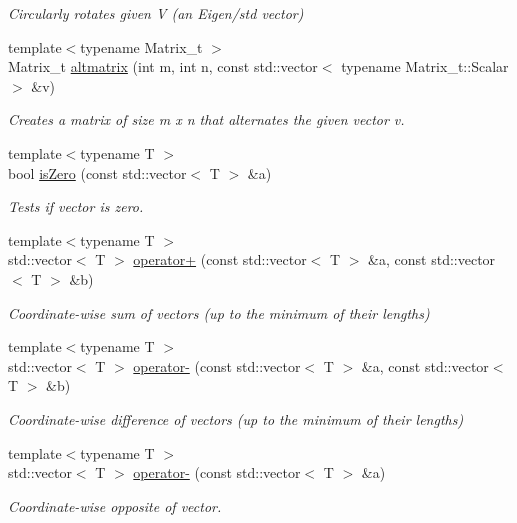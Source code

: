 \begin{DoxyCompactItemize}
\begin{DoxyCompactList}\small\item\em Circularly rotates given V (an Eigen/std vector) \end{DoxyCompactList}\item 
{\footnotesize template$<$typename Matrix\+\_\+t $>$ }\\Matrix\+\_\+t \hyperlink{namespaceMackey_a26a529f63caac9c5b4dc809e0e5831be}{altmatrix} (int m, int n, const std\+::vector$<$ typename Matrix\+\_\+t\+::\+Scalar $>$ \&v)
\begin{DoxyCompactList}\small\item\em Creates a matrix of size m x n that alternates the given vector v. \end{DoxyCompactList}\item 
{\footnotesize template$<$typename T $>$ }\\bool \hyperlink{namespaceMackey_a4c3647777bc890a4649ae24b138bbb79}{is\+Zero} (const std\+::vector$<$ T $>$ \&a)
\begin{DoxyCompactList}\small\item\em Tests if vector is zero. \end{DoxyCompactList}\item 
{\footnotesize template$<$typename T $>$ }\\std\+::vector$<$ T $>$ \hyperlink{namespaceMackey_adb4974b5ffe533abb955ccb6b9096155}{operator+} (const std\+::vector$<$ T $>$ \&a, const std\+::vector$<$ T $>$ \&b)
\begin{DoxyCompactList}\small\item\em Coordinate-\/wise sum of vectors (up to the minimum of their lengths) \end{DoxyCompactList}\item 
{\footnotesize template$<$typename T $>$ }\\std\+::vector$<$ T $>$ \hyperlink{namespaceMackey_ae86e49097ef9a09ebcd0173881e88786}{operator-\/} (const std\+::vector$<$ T $>$ \&a, const std\+::vector$<$ T $>$ \&b)
\begin{DoxyCompactList}\small\item\em Coordinate-\/wise difference of vectors (up to the minimum of their lengths) \end{DoxyCompactList}\item 
{\footnotesize template$<$typename T $>$ }\\std\+::vector$<$ T $>$ \hyperlink{namespaceMackey_a9d67cfe3e93ac3ef2301547372b48e15}{operator-\/} (const std\+::vector$<$ T $>$ \&a)
\begin{DoxyCompactList}\small\item\em Coordinate-\/wise opposite of vector. \end{DoxyCompactList}\item 

\end{DoxyCompactItemize}

